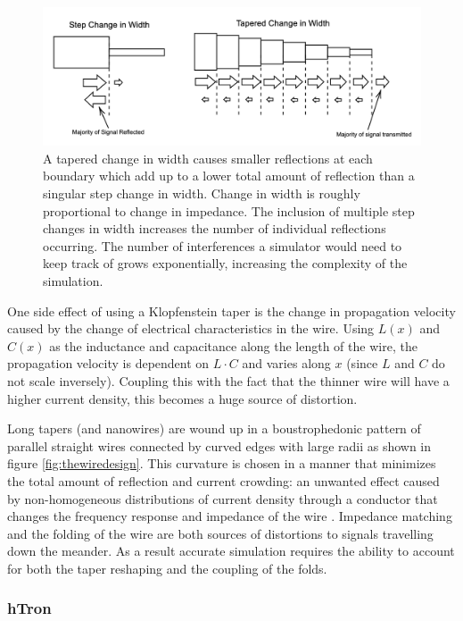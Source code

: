 \begin{figure}[h]
  \centering
  \includegraphics[width=5in]{figs/whatsataper.png}
  
  \caption{A tapered change in width causes smaller reflections at each boundary which add up to a lower total amount of reflection than a singular step change in width. Change in width is roughly proportional to change in impedance. The inclusion of multiple step changes in
  width increases the number of individual reflections occurring. 
  The number of interferences a simulator would need to keep track of grows 
  exponentially, increasing the complexity of the simulation.}
 \label{fig:whatsataper}
\end{figure}

One side effect of using a Klopfenstein taper is the change in propagation velocity 
caused by the change of electrical characteristics in the wire. Using $L(x)$ and $C(x)$ 
as the inductance and capacitance along the length of the wire, 
the propagation velocity is dependent on $L\cdot C$ and varies along $x$ (since 
$L$ and $C$ do not scale inversely). Coupling this with the fact that the thinner wire will 
have a higher current density, this becomes a huge source of distortion.

Long tapers (and nanowires) are wound up in a 
boustrophedonic pattern of parallel straight wires 
connected by curved edges with 
large radii as shown in figure \ref{fig:thewiredesign}. This curvature is chosen in a manner that minimizes the total amount of reflection
and current crowding: an unwanted effect caused by non-homogeneous distributions 
of current density through a conductor that changes the frequency response and impedance 
of the wire \cite{Akhlaghi:12}. Impedance matching and the folding of 
the wire are both sources of distortions
to signals travelling down the meander. As a result accurate simulation requires the ability to account for both the taper reshaping and the coupling of the folds.

\subsubsection{hTron}

